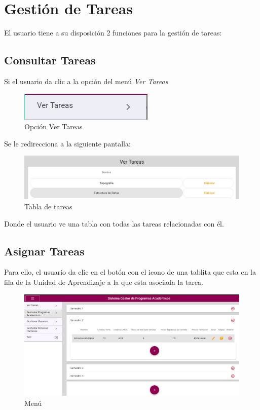 \section{Gestión de Tareas}
    El usuario tiene a su disposición 2 funciones para la gestión de tareas:
    \subsection{Consultar Tareas}

        Si el usuario da clic a la opción del menú \textit{Ver Tareas}

        \begin{figure}[H]
            \centering
            \hypertarget{VERT}{\includegraphics[width=0.7\linewidth]{images/Tareas/Vertareaboton}}
            \caption{Opción Ver Tareas}
            \label{VERT}
        \end{figure}

        Se le redirecciona a la siguiente pantalla:
        \begin{figure}[H]
            \centering
            \hypertarget{asignart}{\includegraphics[width=0.7\linewidth]{images/Tareas/Vertareas}}
            \caption{Tabla de tareas}
            \label{asignart}
        \end{figure}
        Donde el usuario ve una tabla con todas las tareas relacionadas con él.

    \subsection{Asignar Tareas}

        Para ello, el usuario da clic en el botón con el icono de una tablita que esta en la fila de la Unidad de Aprendizaje a la que esta asociada la tarea.


        \begin{figure}[H]
            \centering
            \hypertarget{menu}{\includegraphics[width=0.7\linewidth]{images/Tareas/Menu}}
            \caption{Menú}
            \label{menu}
        \end{figure}


